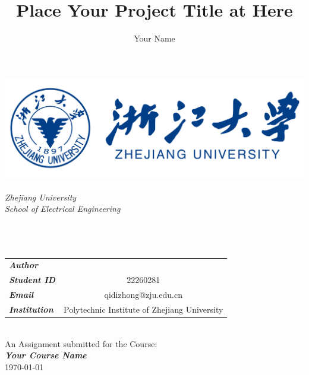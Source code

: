 \documentclass{article}
\begin{document}

\title{Place Your Project Title at Here}
\author{\textup{Your Name}}

\begin{titlepage}
	\centering
	\includegraphics[width=0.8\linewidth]{./fig/ZJU logo.png}\\[1cm]

	\center
	\quad	\\[1.5cm]

	\textsl{\Large Zhejiang University}				\\[0.5cm] 
	\textsl{\large School of Electrical Engineering}\\[0.5cm] 
	
	\makeatletter
	\HRule{2.0pt} 				\\[0.5cm]
	{\huge \bfseries \@title} 	\\[0.4cm] 
	\HRule{2.0pt} 				\\[1.5cm]

	\begin{minipage}{\textwidth}
		\center
		\begin{tabular}{lc}
			\large \emph{\textbf{Author}}        & \@author                        \\
			\large \emph{\textbf{Student ID}}    & \textup{22260281}               \\
			\large \emph{\textbf{Email}}         & \textup{qidizhong@zju.edu.cn}   \\
			\large \emph{\textbf{Institution}}   & \textup{Polytechnic Institute of Zhejiang University}
		\end{tabular}
	\end{minipage}	\\[4cm]

	\makeatother
	{\large An Assignment submitted for the Course:}	\\[0.5cm]
	{\Large \emph{\textbf{Your Course Name}}}		\\[0.5cm]
	{\large \today}										\\[2cm] 
	\vfill 
\end{titlepage}
\newpage
\end{document}
